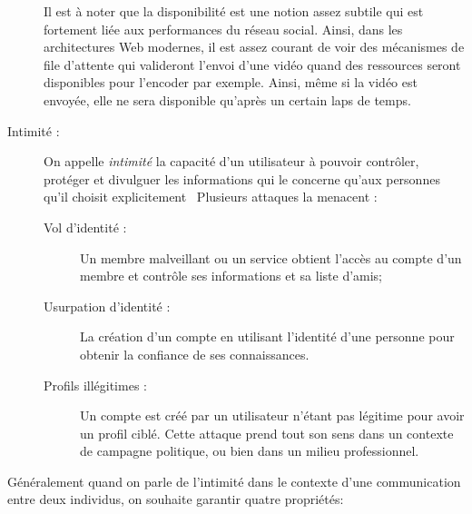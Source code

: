 \begin{description}
Il est à noter que la disponibilité est une notion assez subtile qui est
fortement liée aux performances du réseau social. Ainsi, dans les architectures
Web modernes, \cite{youtube} il est assez courant de voir des mécanismes de file
d'attente qui valideront l'envoi d'une vidéo quand des ressources seront
disponibles pour l'encoder par exemple.  Ainsi, même si la vidéo est envoyée,
elle ne sera disponible qu'après un certain laps de temps.


\item[Intimité :] On appelle \textit{intimité} la capacité d’un utilisateur à pouvoir
contrôler, protéger et divulguer les informations qui le concerne qu'aux
personnes qu'il choisit explicitement  Plusieurs attaques la menacent :

\begin{description}
\item[Vol d'identité :] Un membre malveillant ou un service obtient l’accès au
compte d’un membre et contrôle ses informations et sa liste d’amis;

\item[Usurpation d'identité :] La création d’un compte en utilisant l’identité
d’une personne pour obtenir la confiance de ses connaissances.

\item[Profils illégitimes :] Un compte est créé par un utilisateur n'étant pas
légitime pour avoir un profil ciblé. Cette attaque prend tout son sens dans un
contexte de campagne politique, ou bien dans un milieu professionnel.

\end{description}
\end{description}

Généralement quand on parle de l’intimité dans le contexte d’une
communication entre deux individus, on souhaite garantir
quatre propriétés: \cite{handbook}

